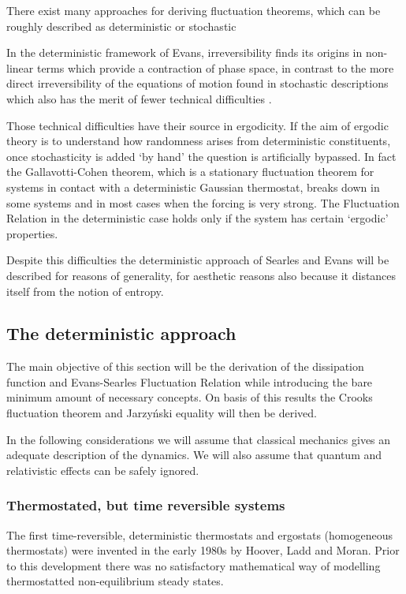 \documentclass[a4paper,12pt]{article}
\begin{document}
There exist many approaches for deriving fluctuation theorems, which can be roughly described as deterministic\cite{Evans:2002gg}\cite{Evans:2016tq} or stochastic \cite{Kurchan:1998}

In the deterministic framework of Evans, irreversibility finds its origins in non-linear terms which provide a contraction of phase space, in contrast to the more direct irreversibility of the equations of motion found in stochastic descriptions which also has the merit of fewer technical difficulties \cite{Crooks:2008ta}. 

Those technical difficulties have their source in ergodicity. If the aim of ergodic theory is to understand how randomness arises from deterministic constituents, once stochasticity is added ‘by hand’ the question is artificially bypassed.
In fact the Gallavotti-Cohen theorem, which is a stationary fluctuation theorem for systems in contact with a deterministic Gaussian thermostat, breaks down in some systems and in most cases when the forcing is very strong.
The Fluctuation Relation in the deterministic case holds only if the system has certain ‘ergodic’ properties\cite{Kurchan:2009ub}.

Despite this difficulties the deterministic approach of Searles and Evans will be described for reasons of generality, for aesthetic reasons also because it distances itself from the notion of entropy.

\subsection{The deterministic approach}

The main objective of this section will be the derivation of the dissipation function and Evans-Searles Fluctuation Relation while introducing the bare minimum amount of necessary concepts. On basis of this results the Crooks fluctuation theorem and Jarzyński equality will then be derived.  

In the following considerations we will assume that classical mechanics gives an adequate description of the dynamics. We will also assume that quantum and relativistic effects can be safely ignored.

\subsubsection{Thermostated, but time reversible systems}

The first time-reversible, deterministic thermostats and ergostats (homogeneous thermostats) were invented in the early 1980s by Hoover, Ladd and Moran. Prior to this development there was no satisfactory mathematical way of modelling thermostatted non-equilibrium steady states\cite{Hoover:1982dp}.
\end{document}
